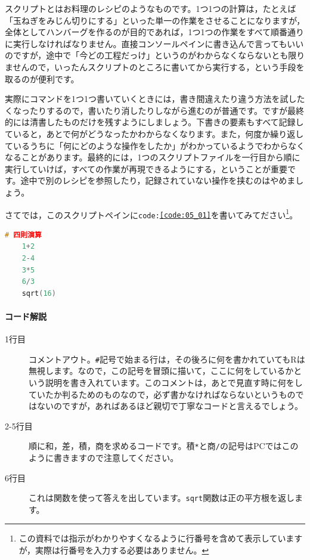 \documentclass{ltjsbook}
\begin{document}
スクリプトとはお料理のレシピのようなものです。1つ1つの計算は，たとえば「玉ねぎをみじん切りにする」といった単一の作業をさせることになりますが，全体としてハンバーグを作るのが目的であれば，1つ1つの作業をすべて順番通りに実行しなければなりません。直接コンソールペインに書き込んで言ってもいいのですが，途中で「今どの工程だっけ」というのがわからなくならないとも限りませんので，いったんスクリプトのところに書いてから実行する，という手段を取るのが便利です。

実際にコマンドを1つ1つ書いていくときには，書き間違えたり違う方法を試したくなったりするので，書いたり消したりしながら進むのが普通です。ですが最終的には清書したものだけを残すようにしましょう。下書きの要素もすべて記録していると，あとで何がどうなったかわからなくなります。また，何度か繰り返しているうちに「何にどのような操作をしたか」がわかっているようでわからなくなることがあります。最終的には，1つのスクリプトファイルを一行目から順に実行していけば，すべての作業が再現できるようにする，ということが重要です。途中で別のレシピを参照したり，記録されていない操作を挟むのはやめましょう。

さてでは，このスクリプトペインに\texttt{code:\ref{code:05_01}}を書いてみてださい\footnote{この資料では指示がわかりやすくなるように行番号を含めて表示していますが，実際は行番号を入力する必要はありません。}。

\begin{lstlisting}[language=c++,label={code:05_01},caption={四則演算のコード}]
	# 四則演算
	1+2
	2-4
	3*5
	6/3
	sqrt(16)
\end{lstlisting}

\paragraph{コード解説}
\begin{description}
	\item[1行目] コメントアウト。\verb|#|記号で始まる行は，その後ろに何を書かれていてもRは無視します。なので，この記号を冒頭に描いて，ここに何をしているかという説明を書き入れています。このコメントは，あとで見直す時に何をしていたか判るためのものなので，必ず書かなければならないというものではないのですが，あればあるほど親切で丁寧なコードと言えるでしょう。
	\item[2-5行目] 順に和，差，積，商を求めるコードです。積\verb|*|と商\verb|/|の記号はPCではこのように書きますので注意してください。
	\item[6行目] これは関数を使って答えを出しています。\texttt{sqrt}関数は正の平方根を返します。
\end{description}
\end{document}
